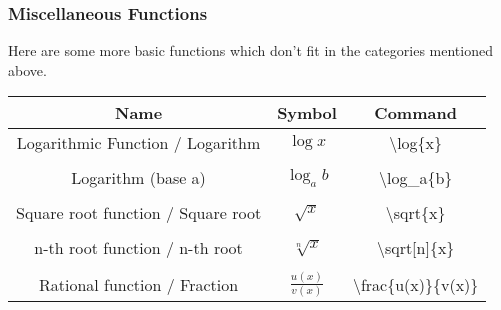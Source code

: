   \subsubsection{Miscellaneous Functions}
  Here are some more basic functions which don't fit in the categories mentioned above.
  \begin{center}
  \begin{tabular}{ccc}
  \toprule  %
  Name&	Symbol&	Command\\
  \midrule  %
  Logarithmic Function / Logarithm
    & $\log{x}$
    & \textbackslash log\{x\}\\
  \\
  Logarithm (base a)
    & $\log_a{b}$
    & \textbackslash log\_a\{b\}\\
  \\
  Square root function / Square root
    & $\sqrt{x}$
    & \textbackslash sqrt\{x\}\\
  \\
  n-th root function / n-th root
    & $\sqrt[n]{x}$
    & \textbackslash sqrt[n]\{x\}\\
  \\
  Rational function / Fraction
    & $\frac{u(x)}{v(x)}$
    & \textbackslash frac\{u(x)\}\{v(x)\}\\
  \bottomrule %
  \end{tabular}
  \end{center}
  
  
